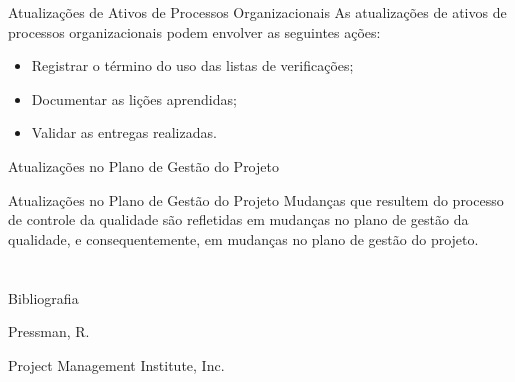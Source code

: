 \documentclass[xcolor=x11names,compress]{beamer}
\begin{document}
\begin{frame}{Atualizações de Ativos de Processos Organizacionais}
As atualizações de ativos de processos organizacionais podem envolver as seguintes ações:

 \begin{itemize}
 \itemsep 5mm
 
\item Registrar o término do uso das listas de verificações;

\item Documentar as lições aprendidas;

\item Validar as entregas realizadas.

\end{itemize}

\end{frame}

\begin{frame}{Atualizações no Plano de Gestão do Projeto}

\begin{alertblock}{Atualizações no Plano de Gestão do Projeto}
Mudanças que resultem do processo de controle da qualidade são refletidas em mudanças no plano de gestão da qualidade, e consequentemente, em mudanças no plano de gestão do projeto.
\end{alertblock}

\end{frame}

\section{}

\begin{frame}{Bibliografia}

\begin{thebibliography}{Pressman, 2001}


Pressman, R.



Project Management Institute, Inc.


\end{thebibliography}

\end{frame}
\end{document}

